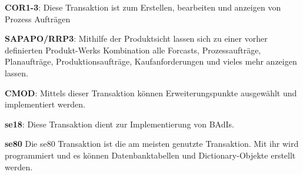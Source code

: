 \textbf{COR1-3}:
\linebreak
Diese Transaktion ist zum Erstellen, bearbeiten und anzeigen von Prozess Aufträgen

\textbf{SAPAPO/RRP3}:
\linebreak
Mithilfe der Produktsicht lassen sich zu einer vorher definierten Produkt-Werks Kombination alle Forcasts, Prozessaufträge, Planaufträge, Produktionsaufträge, Kaufanforderungen und vieles mehr anzeigen lassen.

\textbf{CMOD}:
\linebreak
Mittels dieser Transaktion können Erweiterungspunkte ausgewählt und implementiert werden.

\textbf{se18}:
\linebreak
Diese Transaktion dient zur Implementierung von \ac{BAdI}s.

\textbf{se80}
\linebreak
Die se80 Transaktion ist die am meisten genutzte Transaktion. Mit ihr wird programmiert und es können Datenbanktabellen und Dictionary-Objekte erstellt werden.
